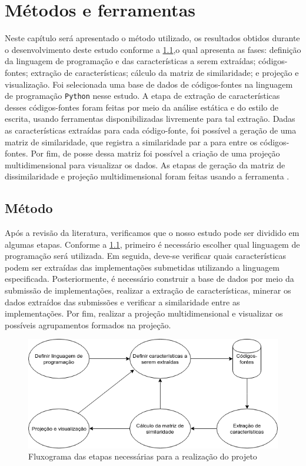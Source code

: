 \chapter{Métodos e ferramentas}
\label{chap:metodos-ferramentas}

	Neste capítulo será apresentado o método utilizado, os resultados obtidos durante
	o desenvolvimento deste estudo conforme a \cref{fig:fluxogramaProposta},o qual
	apresenta as fases: definição da linguagem de programação e das características
	a serem extraídas; códigos-fontes; extração de características; cálculo da matriz
	de similaridade; e projeção e visualização. Foi selecionada uma base de dados de
	códigos-fontes na linguagem de programação \texttt{Python} nesse estudo. A etapa
	de extração de características desses códigos-fontes foram feitas por meio da
	análise estática e do estilo de escrita, usando ferramentas disponibilizadas
	livremente para tal extração. Dadas as características extraídas para cada
	código-fonte, foi possível a geração de uma matriz de similaridade, que registra
	a similaridade par a para entre os códigos-fontes. Por fim, de posse dessa matriz
	foi possível a criação de uma projeção multidimensional para visualizar os dados.
	As etapas de geração da matriz de dissimilaridade e projeção multidimensional
	foram feitas usando a ferramenta .
	 


 	\section{Método}
	 	Após a revisão da literatura, verificamos que o nosso estudo pode ser dividido
	 	em algumas etapas. Conforme a \cref{fig:fluxogramaProposta}, primeiro é necessário
	 	escolher qual linguagem de programação será utilizada. Em seguida, deve-se verificar
	 	quais características podem ser extraídas das implementações submetidas utilizando a
	 	linguagem especificada. Posteriormente, é necessário construir a base de dados por
	 	meio da submissão de implementações, realizar a extração de características, minerar
	 	os dados extraídos das submissões e verificar a similaridade entre as implementações.
	 	Por fim, realizar a projeção multidimensional e visualizar os possíveis agrupamentos
	 	formados na projeção.
	 	
	 	\begin{figure}[h]
	 		\centering
	 		\includegraphics[width=0.7\linewidth]{imagem/fluxogramaProposta}
	 		\caption{Fluxograma das etapas necessárias para a realização do projeto}
	 		\label{fig:fluxogramaProposta}
	 	\end{figure}
	 	

